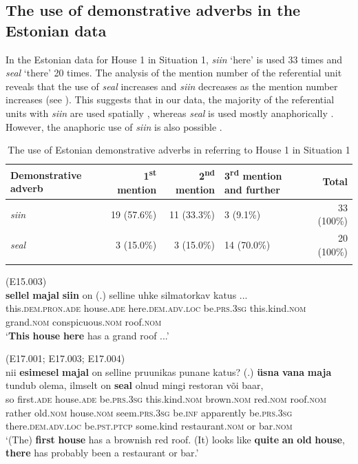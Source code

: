 \documentclass[output=paper,colorlinks,citecolor=brown]{langscibook}
\begin{document}
\subsection{The use of demonstrative adverbs in the Estonian data}\label{sec:nahkola:4.2}

In the Estonian data for House 1 in Situation 1, \textit{siin} ‘here’ is used 33 times and \textit{seal} ‘there’ 20 times. The analysis of the mention number of the referential unit reveals that the use of \textit{seal} increases and \textit{siin} decreases as the mention number increases (see ). This suggests that in our data, the majority of the referential units with \textit{siin} are used spatially , whereas \textit{seal} is used mostly anaphorically . However, the anaphoric use of \textit{siin} is also possible .

\begin{table}
\begin{tabularx}{\textwidth}{XrrYr}
\lsptoprule
{Demonstrative adverb} & {1\textsuperscript{st} mention} & {2\textsuperscript{nd} mention} & {3\textsuperscript{rd} mention and further} & {Total}\\
\midrule
{\textit{siin}} & {19 (57.6\%)} & {11 (33.3\%)} & {3 (9.1\%)} & {33 (100\%)}\\
{\textit{seal}} & {3 (15.0\%)} & {3 (15.0\%)} & {14 (70.0\%)} & {20 (100\%)}\\
\lspbottomrule
\end{tabularx}
\caption{The use of Estonian demonstrative adverbs in referring to House 1 in Situation 1}
\label{tab:nahkola:5}
\end{table}

\ea\label{ex:nahkola:4} (E15.003)\\
\gll \textbf{sellel} \textbf{majal} \textbf{siin} on (.) selline uhke silmatorkav katus ...\\
     this.\textsc{dem.pron.ade} house.\textsc{ade} here.\textsc{dem.adv.loc} be.\textsc{prs.3sg} {} this.kind.\textsc{nom} grand.\textsc{nom} conspicuous.\textsc{nom} roof.\textsc{nom}\\
\glt ‘\textbf{This} \textbf{house} \textbf{here} has a grand roof ...’ 
\z

\ea\label{ex:nahkola:5} (E17.001; E17.003; E17.004)\\
\gll nii \textbf{esimesel} \textbf{majal} on selline pruunikas punane katus? (.) \textbf{üsna} \textbf{vana} \textbf{maja} tundub olema, ilmselt on \textbf{seal} olnud mingi restoran või baar,\\
     so first.\textsc{ade} house.\textsc{ade} be.\textsc{prs.3sg} this.kind.\textsc{nom} brown.\textsc{nom} red.\textsc{nom} roof.\textsc{nom} {} rather old.\textsc{nom} house.\textsc{nom} seem.\textsc{prs.3sg} be.\textsc{inf} apparently be.\textsc{prs.3sg} there.\textsc{dem.adv.loc} be.\textsc{pst.ptcp} some.kind restaurant.\textsc{nom} or bar.\textsc{nom}\\
\glt ‘(The) \textbf{first} \textbf{house} has a brownish red roof. (It) looks like \textbf{quite} \textbf{an} \textbf{old} \textbf{house}, \textbf{there} has probably been a restaurant or bar.’ 
\z
\end{document}
